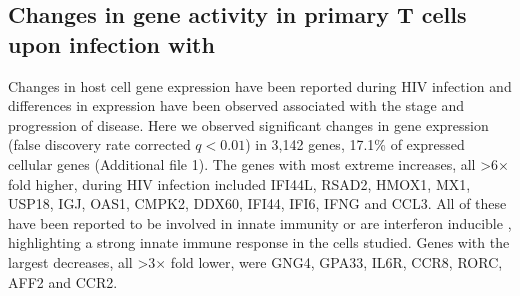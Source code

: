 \documentclass[../sherrill-Mix_thesis.tex]{subfiles}
\begin{document}
		\begin{table}
			\caption[Samples and RNA-Seq sequencing coverage]{Samples used in this study, their infection rates and sequencing depth.}
			\label{tabSamples}
		\end{table}

	\subsection{Changes in gene activity in primary T cells upon infection with \hivEight{}} %
		Changes in host cell gene expression have been reported during HIV infection \citep{Corbeil2001,Mitchell2003,Woelk2004,Hyrcza2007,Wu2008,Rotger2010,Smith2010,Lefebvre2011,Chang2011,Imbeault2012,Mohammadi2013,Peng2014} and differences in expression have been observed associated with the stage \citep{Li2009} and progression \citep{Rotger2011} of disease. Here we observed significant changes in gene expression (false discovery rate corrected $q<0.01$) in 3,142 genes, 17.1\% of expressed cellular genes (Additional file 1). The genes with most extreme increases, all \textgreater{}6$\times$ fold higher, during HIV infection included IFI44L, RSAD2, HMOX1, MX1, USP18, IGJ, OAS1, CMPK2, DDX60, IFI44, IFI6, IFNG and CCL3. All of these have been reported to be involved in innate immunity \citep{Breuer2013} or are interferon inducible \citep{Rusinova2013}, highlighting a strong innate immune response in the cells studied. Genes with the largest decreases, all \textgreater{}3$\times$ fold lower, were GNG4, GPA33, IL6R, CCR8, RORC, AFF2 and CCR2.
\end{document}
